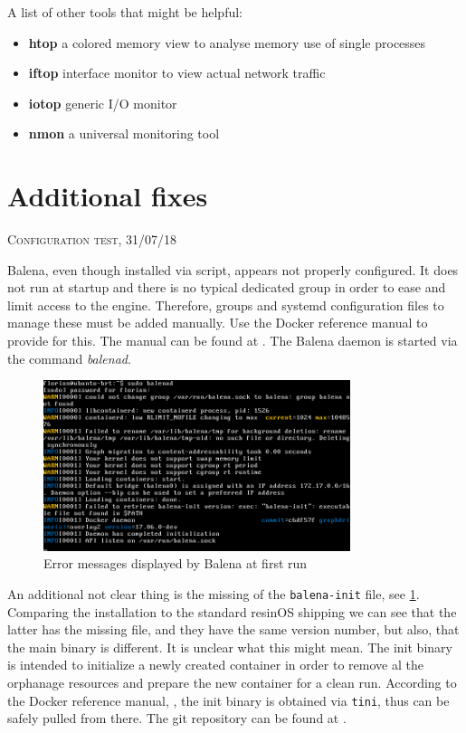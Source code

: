 \documentclass[]{scrartcl}
\begin{document}
A list of other tools that might be helpful:

\begin{itemize}
	\item \textbf{htop} a colored memory view to analyse memory use of single processes
	\item \textbf{iftop} interface monitor to view actual network traffic
	\item \textbf{iotop} generic I/O monitor
	\item \textbf{nmon} a universal monitoring tool
\end{itemize}

\section{Additional fixes}
{\small\textsc{Configuration test, 31/07/18} \bigskip}

Balena, even though installed via script, appears not properly configured. It does not run at startup and there is no typical dedicated group in order to ease and limit access to the engine.
Therefore, groups and systemd configuration files to manage these must be added manually. Use the Docker reference manual to provide for this. The manual can be found at \cite{docker02}. The Balena daemon is started via the command \textit{balenad}.

\begin{figure}[t]
	\centering
	\includegraphics[width=0.8\textwidth]{balena-err}
	\caption{Error messages displayed by Balena at first run}
	\label{fig:balenad}
\end{figure}

An additional not clear thing is the missing of the \texttt{balena-init} file, see \ref{fig:balenad}. Comparing the installation to the standard resinOS shipping we can see that the latter has the missing file, and they have the same version number, but also, that the main binary is different. It is unclear what this might mean. The init binary is intended to initialize a newly created container in order to remove al the orphanage resources and prepare the new container for a clean run. According to the Docker reference manual, \cite{docker03}, the init binary is obtained via \texttt{tini}, thus can be safely pulled from there. The git repository can be found at \cite{tini01}.
\end{document}

